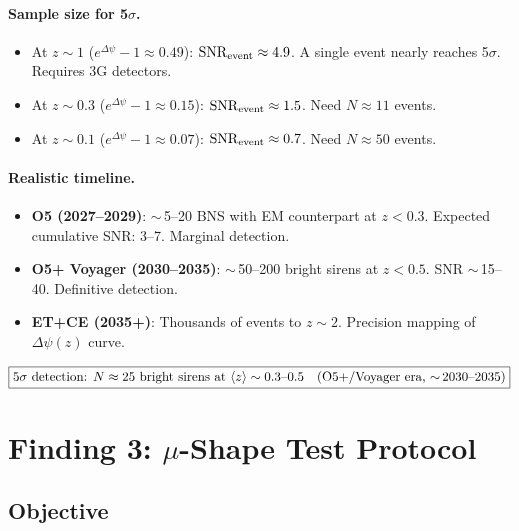 \documentclass[11pt,a4paper]{article}
\newcommand{\Dpsi}{\Delta\psi}
\begin{document}
\paragraph{Sample size for 5$\sigma$.}
\begin{itemize}
\item At $z \sim 1$ ($e^{\Dpsi} - 1 \approx 0.49$):
  ${\rm SNR}_{\rm event} \approx 4.9$.  A single event nearly reaches
  5$\sigma$.  Requires 3G detectors.
\item At $z \sim 0.3$ ($e^{\Dpsi} - 1 \approx 0.15$):
  ${\rm SNR}_{\rm event} \approx 1.5$.  Need $N \approx 11$ events.
\item At $z \sim 0.1$ ($e^{\Dpsi} - 1 \approx 0.07$):
  ${\rm SNR}_{\rm event} \approx 0.7$.  Need $N \approx 50$ events.
\end{itemize}

\paragraph{Realistic timeline.}
\begin{itemize}
\item \textbf{O5 (2027--2029)}: $\sim$\,5--20 BNS with EM counterpart
  at $z < 0.3$.  Expected cumulative SNR: 3--7.  Marginal detection.
\item \textbf{O5+ Voyager (2030--2035)}: $\sim$\,50--200 bright sirens
  at $z < 0.5$.  SNR $\sim$\,15--40.  Definitive detection.
\item \textbf{ET+CE (2035+)}: Thousands of events to $z \sim 2$.
  Precision mapping of $\Dpsi(z)$ curve.
\end{itemize}

\begin{equation}
\boxed{
\text{5$\sigma$ detection: } N \approx 25 \text{ bright sirens at }
\langle z \rangle \sim 0.3\text{--}0.5
\quad \text{(O5+/Voyager era, $\sim$\,2030--2035)}
}
\end{equation}


\section{Finding 3: $\mu$-Shape Test Protocol}
\label{sec:mu-protocol}

\subsection{Objective}
\end{document}

